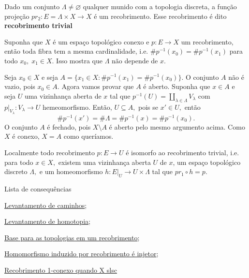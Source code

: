 \begin{ex}
    Dado um conjunto $\Lambda\ne \varnothing$ qualquer munido com a topologia discreta, a função projeção $pr_2:E=\Lambda\times X\rightarrow X$ é um recobrimento. Esse recobrimento é dito \textbf{recobrimento trivial}
\end{ex}

\begin{prop}
    Suponha que $X$ é um espaço topológico conexo e $p:E\rightarrow X$ um recobrimento, então toda fibra tem a mesma cardinalidade, i.e. $\# p^{-1}(x_0)=\# p^{-1}(x_1)$ para todo $x_0,\;x_1\in X.$ Isso mostra que $\Lambda$ não depende de $x$.
\end{prop}

\begin{dem}
    Seja $x_0\in X$ e seja $A=\{x_1\in X: \#p^{-1}(x_1)=\# p^{-1}(x_0)\}.$ O conjunto $A$ não é vazio, pois $x_0\in A.$ Agora vamos provar que $A$ é aberto. Suponha que $x\in A$ e seja $U$ uma vizinhança aberta de $x$ tal que $p^{-1}(U)=\amalg_{\lambda\in \Lambda} V_\lambda$ com $p|_{V_\lambda}:V_\lambda\rightarrow U$ hemeomorfismo. Então, $U\subseteq A,$ pois se $x'\in U,$ então 
    $$\# p^{-1}(x')=\# \Lambda=\# p^{-1}(x)=\# p^{-1}(x_0).$$
    O conjunto $A$ é fechado, pois $X\setminus A$ é aberto pelo mesmo argumento acima. Como $X$ é conexo, $X=A$ como queríamos. 
\end{dem}

\begin{nota}
    Localmente todo recobrimento $p:E\rightarrow U$ é isomorfo ao recobrimento trivial, i.e. para todo $x\in X,$ existem uma vizinhança aberta $U$ de $x$, um espaço topológico discreto $\Lambda,$ e um homeomorfismo $h: E|_U\rightarrow U\times \Lambda$ tal que $pr_1\circ h= p.$
\end{nota}

\begin{titlemize}{Lista de consequências}
	\item \hyperref[levantamento-de-caminhos-prop]{Levantamento de caminhos};\\ %
	\item \hyperref[levantamento-de-homotopia-prop]{Levantamento de homotopia};\\
 	\item \hyperref[base-para-topologias-em-recobrimento-prop]{Base para as topologias em um recobrimento};\\
  	\item \hyperref[homomorfismo-induzido-por-recobrimento-prop]{Homomorfismo induzido por recobrimento é injetor};\\
   	\item \hyperref[recobrimento-1-conexo-prop]{Recobrimento 1-conexo quando X slsc}
\end{titlemize}
